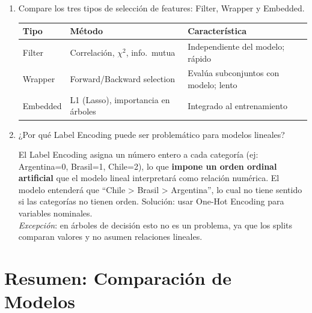 \documentclass[11pt,a4paper]{article}
\begin{document}
\begin{enumerate}[label=\textbf{P\arabic*.}, resume]

\item Compare los tres tipos de selecci\'on de features: Filter, Wrapper y Embedded.

\begin{answerbox}
\begin{center}
\begin{tabular}{lll}
\toprule
\textbf{Tipo} & \textbf{M\'etodo} & \textbf{Caracter\'istica}\\
\midrule
Filter & Correlaci\'on, $\chi^2$, info.\ mutua & Independiente del modelo; r\'apido\\
Wrapper & Forward/Backward selection & Eval\'ua subconjuntos con modelo; lento\\
Embedded & L1 (Lasso), importancia en \'arboles & Integrado al entrenamiento\\
\bottomrule
\end{tabular}
\end{center}
\end{answerbox}

\item ¿Por qu\'e Label Encoding puede ser problem\'atico para modelos lineales?

\begin{answerbox}
El Label Encoding asigna un n\'umero entero a cada categor\'ia (ej: Argentina=0,
Brasil=1, Chile=2), lo que \textbf{impone un orden ordinal artificial} que el modelo
lineal interpretar\'a como relaci\'on num\'erica. El modelo entender\'a que
``Chile > Brasil > Argentina'', lo cual no tiene sentido si las categor\'ias no tienen
orden. Soluci\'on: usar One-Hot Encoding para variables nominales.\\
\textit{Excepci\'on}: en \'arboles de decisi\'on esto no es un problema, ya que los
splits comparan valores y no asumen relaciones lineales.
\end{answerbox}

\end{enumerate}

\section{Resumen: Comparaci\'on de Modelos}
\end{document}
